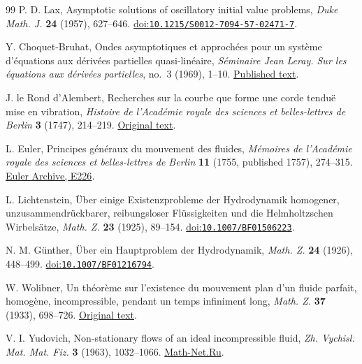 \begin{thebibliography}{99}
 P. D. Lax,
Asymptotic solutions of oscillatory initial value problems,
\emph{Duke Math. J.} \textbf{24} (1957), 627--646.
\href{https://doi.org/10.1215/S0012-7094-57-02471-7}{doi:\nolinkurl{10.1215/S0012-7094-57-02471-7}}.

 Y. Choquet-Bruhat,
Ondes asymptotiques et approch\'ees pour un syst\`eme d'\'equations
aux d\'eriv\'ees partielles quasi-lin\'eaire,
\emph{S\'eminaire Jean Leray. Sur les \'equations aux d\'eriv\'ees partielles},
no.~3 (1969), 1--10.
\href{https://numdam.org/item/SJL_1969___3_1_0/}{Published text}.

 J. le Rond d'Alembert,
Recherches sur la courbe que forme une corde tendu\"e mise en vibration,
\emph{Histoire de l'Acad\'emie royale des sciences et belles-lettres de Berlin}
\textbf{3} (1747), 214--219.
\href{https://webusers.imj-prg.fr/~david.aubin/cours/Textes/Dalembert-HAB-1747-cordes-vibrantes.pdf}{Original text}.

 L. Euler,
Principes g\'en\'eraux du mouvement des fluides,
\emph{M\'emoires de l'Acad\'emie royale des sciences et belles-lettres de Berlin}
\textbf{11} (1755, published 1757), 274--315.
\href{https://scholarlycommons.pacific.edu/euler-works/226/}{Euler Archive, E226}.

 L. Lichtenstein,
\"Uber einige Existenzprobleme der Hydrodynamik homogener,
unzusammendr\"uckbarer, reibungsloser Fl\"ussigkeiten und die Helmholtzschen
Wirbels\"atze, \emph{Math. Z.} \textbf{23} (1925), 89--154.
\href{https://doi.org/10.1007/BF01506223}{doi:\nolinkurl{10.1007/BF01506223}}.

 N. M. G\"unther,
\"Uber ein Hauptproblem der Hydrodynamik,
\emph{Math. Z.} \textbf{24} (1926), 448--499.
\href{https://doi.org/10.1007/BF01216794}{doi:\nolinkurl{10.1007/BF01216794}}.

 W. Wolibner,
Un th\'eor\`eme sur l'existence du mouvement plan d'un fluide parfait,
homog\`ene, incompressible, pendant un temps infiniment long,
\emph{Math. Z.} \textbf{37} (1933), 698--726.
\href{https://gdz.sub.uni-goettingen.de/id/PPN266833020_0037?tify=%7B%22pages%22%3A%5B702%5D%7D}{Original text}.

 V. I. Yudovich,
Non-stationary flows of an ideal incompressible fluid,
\emph{Zh. Vychisl. Mat. Mat. Fiz.} \textbf{3} (1963), 1032--1066.
\href{https://www.mathnet.ru/eng/zvmmf7821}{Math-Net.Ru}.


\end{thebibliography}
